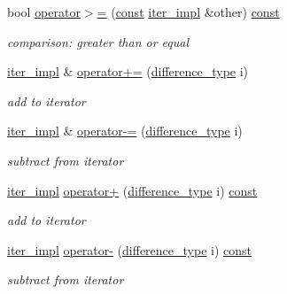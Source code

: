 \begin{DoxyCompactItemize}
bool \hyperlink{classnlohmann_1_1detail_1_1iter__impl_ae87ea99999c169722b388c69871295e3}{operator$>$=} (\hyperlink{functions__c_8js_afacfd9c985d225bb07483b887a801b6f}{const} \hyperlink{classnlohmann_1_1detail_1_1iter__impl}{iter\+\_\+impl} \&other) \hyperlink{functions__c_8js_afacfd9c985d225bb07483b887a801b6f}{const} 
\begin{DoxyCompactList}\small\item\em comparison\+: greater than or equal \end{DoxyCompactList}\item 
\hyperlink{classnlohmann_1_1detail_1_1iter__impl}{iter\+\_\+impl} \& \hyperlink{classnlohmann_1_1detail_1_1iter__impl_a3eef94f9d167046e7f773aeb6b78090c}{operator+=} (\hyperlink{classnlohmann_1_1detail_1_1iter__impl_a2f7ea9f7022850809c60fc3263775840}{difference\+\_\+type} i)
\begin{DoxyCompactList}\small\item\em add to iterator \end{DoxyCompactList}\item 
\hyperlink{classnlohmann_1_1detail_1_1iter__impl}{iter\+\_\+impl} \& \hyperlink{classnlohmann_1_1detail_1_1iter__impl_abcc9d51bc52f2e8483bbe4018f05e978}{operator-\/=} (\hyperlink{classnlohmann_1_1detail_1_1iter__impl_a2f7ea9f7022850809c60fc3263775840}{difference\+\_\+type} i)
\begin{DoxyCompactList}\small\item\em subtract from iterator \end{DoxyCompactList}\item 
\hyperlink{classnlohmann_1_1detail_1_1iter__impl}{iter\+\_\+impl} \hyperlink{classnlohmann_1_1detail_1_1iter__impl_afc5629527a820583cd009c411e30ac64}{operator+} (\hyperlink{classnlohmann_1_1detail_1_1iter__impl_a2f7ea9f7022850809c60fc3263775840}{difference\+\_\+type} i) \hyperlink{functions__c_8js_afacfd9c985d225bb07483b887a801b6f}{const} 
\begin{DoxyCompactList}\small\item\em add to iterator \end{DoxyCompactList}\item 
\hyperlink{classnlohmann_1_1detail_1_1iter__impl}{iter\+\_\+impl} \hyperlink{classnlohmann_1_1detail_1_1iter__impl_aa719903e6d509db51744cfca9c95fd8e}{operator-\/} (\hyperlink{classnlohmann_1_1detail_1_1iter__impl_a2f7ea9f7022850809c60fc3263775840}{difference\+\_\+type} i) \hyperlink{functions__c_8js_afacfd9c985d225bb07483b887a801b6f}{const} 
\begin{DoxyCompactList}\small\item\em subtract from iterator \end{DoxyCompactList}\item 

\end{DoxyCompactItemize}

